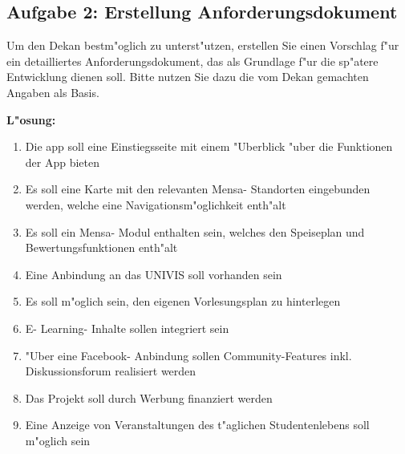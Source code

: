 \subsection{Aufgabe 2: Erstellung Anforderungsdokument}
Um den Dekan bestm"oglich zu unterst"utzen, erstellen Sie einen Vorschlag f"ur ein detailliertes Anforderungsdokument, das als Grundlage f"ur die sp"atere Entwicklung dienen soll. 
Bitte nutzen Sie dazu die vom Dekan gemachten Angaben als Basis.

\textbf{L"osung:}
\begin{enumerate}
    \item Die app soll eine Einstiegsseite mit einem "Uberblick "uber die Funktionen der App bieten 
    \item Es soll eine Karte mit den relevanten Mensa- Standorten eingebunden werden, welche eine Navigationsm"oglichkeit enth"alt 
    \item Es soll ein Mensa- Modul enthalten sein, welches den Speiseplan und Bewertungsfunktionen enth"alt 
    \item Eine Anbindung an das UNIVIS soll vorhanden sein 
    \item Es soll m"oglich sein, den eigenen Vorlesungsplan zu hinterlegen
    \item E- Learning- Inhalte sollen integriert sein 
    \item "Uber eine Facebook- Anbindung sollen Community-Features inkl. Diskussionsforum realisiert werden 
    \item Das Projekt soll durch Werbung finanziert werden 
    \item Eine Anzeige von Veranstaltungen des t"aglichen Studentenlebens soll m"oglich sein
\end{enumerate}




